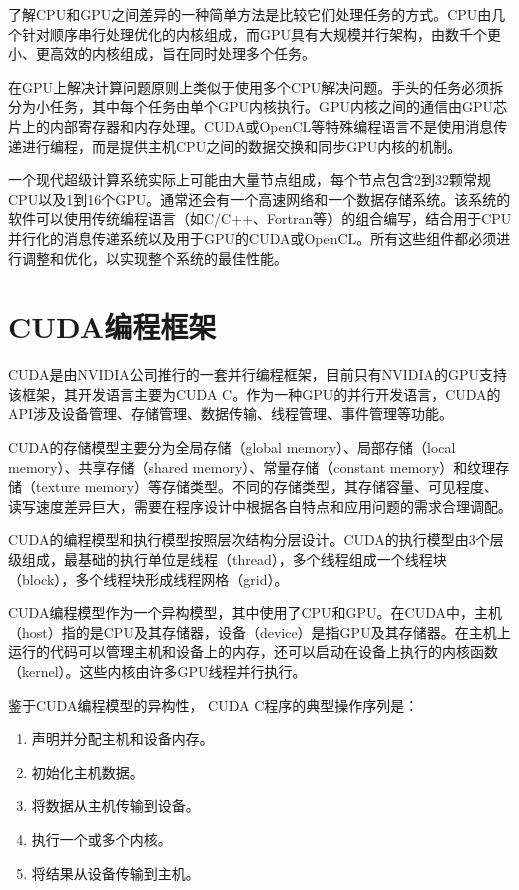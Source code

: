 \documentclass[a4paper,12pt,english]{sphinxmanual}
\begin{document}
\sphinxAtStartPar
了解CPU和GPU之间差异的一种简单方法是比较它们处理任务的方式。CPU由几个针对顺序串行处理优化的内核组成，而GPU具有大规模并行架构，由数千个更小、更高效的内核组成，旨在同时处理多个任务。

\sphinxAtStartPar
在GPU上解决计算问题原则上类似于使用多个CPU解决问题。手头的任务必须拆分为小任务，其中每个任务由单个GPU内核执行。GPU内核之间的通信由GPU芯片上的内部寄存器和内存处理。CUDA或OpenCL等特殊编程语言不是使用消息传递进行编程，而是提供主机CPU之间的数据交换和同步GPU内核的机制。

\sphinxAtStartPar
一个现代超级计算系统实际上可能由大量节点组成，每个节点包含2到32颗常规CPU以及1到16个GPU。通常还会有一个高速网络和一个数据存储系统。该系统的软件可以使用传统编程语言（如C/C++、Fortran等）的组合编写，结合用于CPU并行化的消息传递系统以及用于GPU的CUDA或OpenCL。所有这些组件都必须进行调整和优化，以实现整个系统的最佳性能。


\section{CUDA编程框架}
\label{\detokenize{gpu-computing/gpu-computing:cuda}}
\sphinxAtStartPar
CUDA是由NVIDIA公司推行的一套并行编程框架，目前只有NVIDIA的GPU支持该框架，其开发语言主要为CUDA C。作为一种GPU的并行开发语言，CUDA的API涉及设备管理、存储管理、数据传输、线程管理、事件管理等功能。

\sphinxAtStartPar
CUDA的存储模型主要分为全局存储（global memory）、局部存储（local memory）、共享存储（shared memory）、常量存储（constant memory）和纹理存储（texture memory）等存储类型。不同的存储类型，其存储容量、可见程度、读写速度差异巨大，需要在程序设计中根据各自特点和应用问题的需求合理调配。

\sphinxAtStartPar
CUDA的编程模型和执行模型按照层次结构分层设计。CUDA的执行模型由3个层级组成，最基础的执行单位是线程（thread），多个线程组成一个线程块（block），多个线程块形成线程网格（grid）。

\sphinxAtStartPar
CUDA编程模型作为一个异构模型，其中使用了CPU和GPU。在CUDA中，主机（host）指的是CPU及其存储器，设备（device）是指GPU及其存储器。在主机上运行的代码可以管理主机和设备上的内存，还可以启动在设备上执行的内核函数（kernel）。这些内核由许多GPU线程并行执行。

\sphinxAtStartPar
鉴于CUDA编程模型的异构性， CUDA C程序的典型操作序列是：
\begin{enumerate}
%
\item {} 
\sphinxAtStartPar
声明并分配主机和设备内存。

\item {} 
\sphinxAtStartPar
初始化主机数据。

\item {} 
\sphinxAtStartPar
将数据从主机传输到设备。

\item {} 
\sphinxAtStartPar
执行一个或多个内核。

\item {} 
\sphinxAtStartPar
将结果从设备传输到主机。

\end{enumerate}
\end{document}
